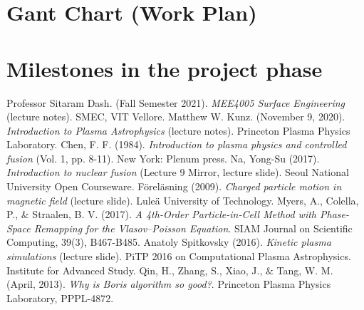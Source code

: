 \documentclass[12pt]{article}
\begin{document}
	\section{Gant Chart (Work Plan)}
	
	\section{Milestones in the project phase}
	
	\begin{thebibliography}{}
		Professor Sitaram Dash. (Fall Semester 2021). \textit{MEE4005 Surface Engineering} (lecture notes). SMEC, VIT Vellore.
		Matthew W. Kunz. (November 9, 2020). \textit{Introduction to Plasma Astrophysics} (lecture notes). Princeton Plasma Physics Laboratory.
		Chen, F. F. (1984). \textit{Introduction to plasma physics and controlled fusion} (Vol. 1, pp. 8-11). New York: Plenum press.
		Na, Yong-Su (2017). \textit{Introduction to nuclear fusion} (Lecture 9 Mirror, lecture slide). Seoul National University Open Courseware.
		F\"{o}rel\"{a}sning (2009). \textit{Charged particle motion in magnetic field} (lecture slide). Lule\"{a} University of Technology.
		Myers, A., Colella, P., \& Straalen, B. V. (2017). \textit{A 4th-Order Particle-in-Cell Method with Phase-Space Remapping for the Vlasov--Poisson Equation}. SIAM Journal on Scientific Computing, 39(3), B467-B485.
		Anatoly Spitkovsky (2016). \textit{Kinetic plasma simulations} (lecture slide). PiTP 2016 on Computational Plasma Astrophysics. Institute for Advanced Study.
		Qin, H., Zhang, S., Xiao, J., $\&$ Tang, W. M. (April, 2013). \textit{Why is Boris algorithm so good?}. Princeton Plasma Physics Laboratory, PPPL-4872.
		
	\end{thebibliography}
\end{document}

